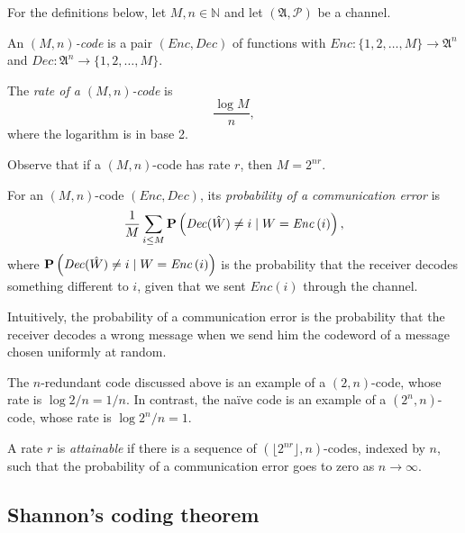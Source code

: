 For the definitions below, let $M, n \in \mathbb{N}$ and let $(\mathfrak{A}, \mathcal{P})$ be a channel.

\begin{definition}
An \emph{$(M, n)$-code} is a pair $(\mathit{Enc}, \mathit{Dec})$ of functions with $\mathit{Enc}: \{1, 2, \ldots, M\} \to \mathfrak{A}^n$ and $\mathit{Dec}: \mathfrak{A}^n \to \{1, 2, \ldots, M\}$.
\end{definition}

\begin{definition}
The \emph{rate of a $(M, n)$-code} is 
%
$$\frac{\log M}{n},$$
%
where the logarithm is in base 2.
\end{definition}

Observe that if a $(M, n)$-code has rate $r$, then $M = 2^{nr}$.

\begin{definition}
For an $(M, n)$-code $(\mathit{Enc}, \mathit{Dec})$,
its \emph{probability of a communication error} is
%
$$\frac{1}{M}\sum_{i \leq M} \mathbf{P}\left(\mathit{Dec}(\hat{W}) \neq i \mid W = \mathit{Enc}\left(i\right)\right),$$
%
where $\mathbf{P}\left(\mathit{Dec}(\hat{W}) \neq i \mid W = \mathit{Enc}\left(i\right)\right)$ is the probability that the receiver decodes something different to $i$, given that we sent $\mathit{Enc}\left(i\right)$ through the channel.
\end{definition}

Intuitively, the probability of a communication error is the probability that the receiver decodes a wrong message when we send him the codeword of a message chosen uniformly at random.

\begin{example}
The $n$-redundant code discussed above is an example of a $(2, n)$-code, whose rate is $\log 2 / n = 1/n$. In contrast, the na\"ive code is an example of a $(2^n, n)$-code, whose rate is $\log 2^n / n = 1$.
\end{example}

\begin{definition}
A rate $r$ is \emph{attainable} if there is a sequence of $\left(\lfloor2^{nr}\rfloor, n\right)$-codes, indexed by $n$, such that the probability of a communication error goes to zero as $n \to \infty$.
\end{definition}

\subsection{Shannon's coding theorem}

